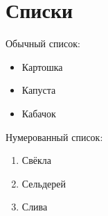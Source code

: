 \documentclass[a4paper, 12pt]{article}
\begin{document}
\section*{Списки}
Обычный список:
\begin{itemize}
	\item Картошка
	\item Капуста
	\item Кабачок
\end{itemize}

Нумерованный список:
\begin{enumerate}
	\item Свёкла
	\item Сельдерей
	\item Слива
\end{enumerate}
\end{document}
